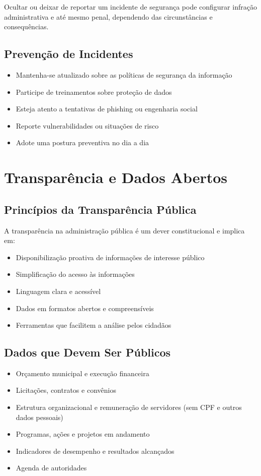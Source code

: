 \documentclass[12pt,a4paper]{article}
\begin{document}
\begin{tcolorbox}[colback=vermelhoclaro, colframe=red!75!black, title=Atenção!]
Ocultar ou deixar de reportar um incidente de segurança pode configurar infração administrativa e até mesmo penal, dependendo das circunstâncias e consequências.
\end{tcolorbox}

\subsection{Prevenção de Incidentes}
\begin{itemize}
    \item Mantenha-se atualizado sobre as políticas de segurança da informação
    \item Participe de treinamentos sobre proteção de dados
    \item Esteja atento a tentativas de phishing ou engenharia social
    \item Reporte vulnerabilidades ou situações de risco
    \item Adote uma postura preventiva no dia a dia
\end{itemize}

\newpage
\section{Transparência e Dados Abertos}

\subsection{Princípios da Transparência Pública}
A transparência na administração pública é um dever constitucional e implica em:
\begin{itemize}
    \item Disponibilização proativa de informações de interesse público
    \item Simplificação do acesso às informações
    \item Linguagem clara e acessível
    \item Dados em formatos abertos e compreensíveis
    \item Ferramentas que facilitem a análise pelos cidadãos
\end{itemize}

\subsection{Dados que Devem Ser Públicos}
\begin{itemize}
    \item Orçamento municipal e execução financeira
    \item Licitações, contratos e convênios
    \item Estrutura organizacional e remuneração de servidores (sem CPF e outros dados pessoais)
    \item Programas, ações e projetos em andamento
    \item Indicadores de desempenho e resultados alcançados
    \item Agenda de autoridades
\end{itemize}
\end{document}
